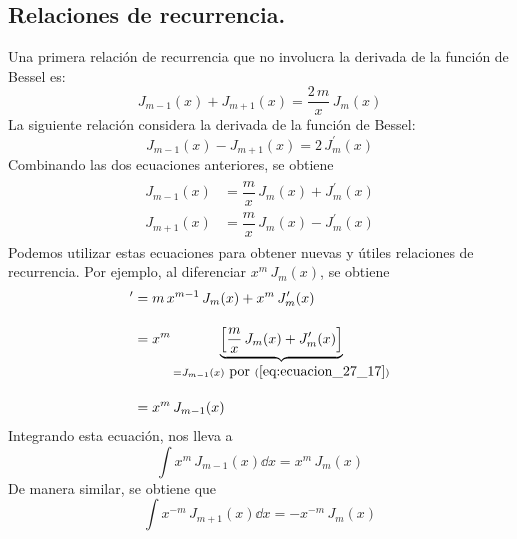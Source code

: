 \subsection{Relaciones de recurrencia.}
Una primera relación de recurrencia que no involucra la derivada de la función de Bessel es:
\begin{equation}
J_{m-1} (x) + J_{m+1} (x) = \dfrac{2 \, m}{x} \, J_{m} (x)
\label{eq:ecuacion_27_15}
\end{equation}
La siguiente relación considera la derivada de la función de Bessel:
\begin{equation}
J_{m-1} (x) - J_{m+1} (x) = 2 \, J_{m}^{\prime} (x)
\label{eq:ecuacion_27_16}
\end{equation}
Combinando las dos ecuaciones anteriores, se obtiene
\begin{align}
\begin{aligned}
J_{m-1}(x) &= \dfrac{m}{x} \, J_{m} (x) + J_{m}^{\prime} (x) \\
J_{m+1}(x) &= \dfrac{m}{x} \, J_{m} (x) - J_{m}^{\prime} (x)
\end{aligned}
\label{eq:ecuacion_27_17}
\end{align}
Podemos utilizar estas ecuaciones para obtener nuevas y útiles relaciones de recurrencia. Por ejemplo, al diferenciar $x^{m} \, J_{m} (x)$, se obtiene
\begin{align*}
[x^{m} \, J_{m} (x)]^{\prime} &= m \, x^{m-1} \, J_{m} (x) + x^{m} \, J_{m}^{\prime} (x) \\[1em]
&= x^{m} \underbrace{ \left[ \dfrac{m}{x} \, J_{m} (x) + J_{m}^{\prime} (x)\right]}_{=J_{m-1}(x) \mbox{ por } (\ref{eq:ecuacion_27_17})}  \\[1em]
&= x^{m} \, J_{m-1} (x)
\end{align*}
Integrando esta ecuación, nos lleva a
\begin{equation}
\int x^{m} \, J_{m-1} (x) \dd{x} = x^{m} \, J_{m} (x)
\label{eq:ecuacion_27_18}
\end{equation}
De manera similar, se obtiene que
\begin{equation}
\int x^{-m} \, J_{m+1} (x) \dd{x} = -x^{-m} \, J_{m} (x)
\label{eq:ecuacion_27_19}
\end{equation}
